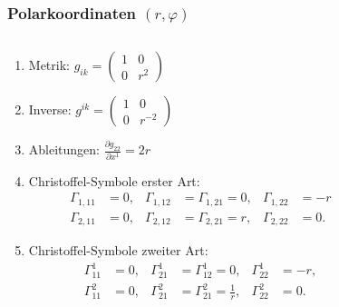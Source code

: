 %
%
%
\bgroup
\begin{frame}[t]
\setlength{\abovedisplayskip}{5pt}
\setlength{\belowdisplayskip}{5pt}
\frametitle{Polarkoordinaten $(r,\varphi)$}
\vspace{-20pt}
\begin{columns}[t,onlytextwidth]
\begin{column}{0.58\textwidth}
\begin{enumerate}
\item<2-> Metrik: 
$\displaystyle
g_{ik}
=
\begin{pmatrix}
1&0\\0&r^2
\end{pmatrix}
$
\item<3-> Inverse: $\displaystyle
g^{ik}
=
\begin{pmatrix}
1&0\\0&r^{-2}
\end{pmatrix}
$
\item<4-> Ableitungen: 
$\displaystyle
\frac{\partial g_{22}}{\partial x^1} = 2r
$
\item<5-> Christoffel-Symbole erster Art:
\[
\begin{aligned}
\Gamma_{1,11} &= 0,
&
\Gamma_{1,12} &= \Gamma_{1,21} = 0,
&
\Gamma_{1,22} &= -r
\\
\Gamma_{2,11} &= 0,
&
\Gamma_{2,12} &= \Gamma_{2,21} = r,
&
\Gamma_{2,22} &= 0.
\end{aligned}
\]
\item<6-> Christoffel-Symbole zweiter Art:
\[
\begin{aligned}
\Gamma^1_{11} &= 0,
&
\Gamma^1_{21} &= \Gamma^1_{12} = 0,
&
\Gamma^1_{22} &= -r,
\\
\Gamma^2_{11} &= 0,
&
\Gamma^2_{21} &= \Gamma^2_{21} = \frac1r,
&
\Gamma^2_{22} &= 0.
\end{aligned}
\]
\end{enumerate}
\end{column}
\begin{column}{0.38\textwidth}
\end{column}
\end{columns}
\end{frame}
\egroup
